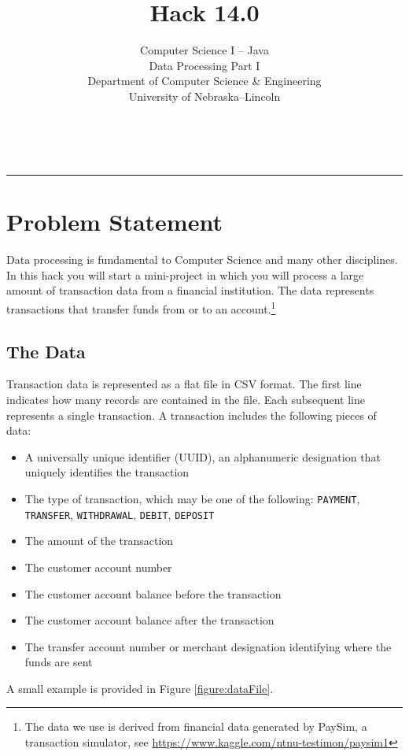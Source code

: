 \documentclass[12pt]{scrartcl}
\title{Hack 14.0}\let\Title\@title
\subtitle{Computer Science I -- Java\\
Data Processing Part I\\
{\small
\vskip1cm
Department of Computer Science \& Engineering \\
University of Nebraska--Lincoln}
\vskip-3cm}
\date{~}
\begin{document}
\maketitle

\hrule



\section*{Problem Statement}


Data processing is fundamental to Computer Science and many other disciplines.
In this hack you will start a mini-project in which you will process a large 
amount of transaction data from a financial institution.  The data represents 
transactions that transfer funds from or to an account.\footnote{The data we 
use is derived from financial data generated by PaySim, a transaction 
simulator, see \url{https://www.kaggle.com/ntnu-testimon/paysim1}}


\subsection*{The Data}

Transaction data is represented as a flat file in CSV format.  The first line
indicates how many records are contained in the file.  Each subsequent line 
represents a single transaction.  A transaction includes the following pieces
of data:
\begin{itemize}
  \item A universally unique identifier (UUID), an alphanumeric designation 
    that uniquely identifies the transaction
  \item The type of transaction, which may be one of the following:
    \texttt{PAYMENT}, \texttt{TRANSFER}, \texttt{WITHDRAWAL}, 
    \texttt{DEBIT}, \texttt{DEPOSIT}
  \item The amount of the transaction
  \item The customer account number
  \item The customer account balance before the transaction
  \item The customer account balance after the transaction
  \item The transfer account number or merchant designation identifying where the funds are sent 
\end{itemize}
A small example is provided in Figure \ref{figure:dataFile}.
\end{document}
